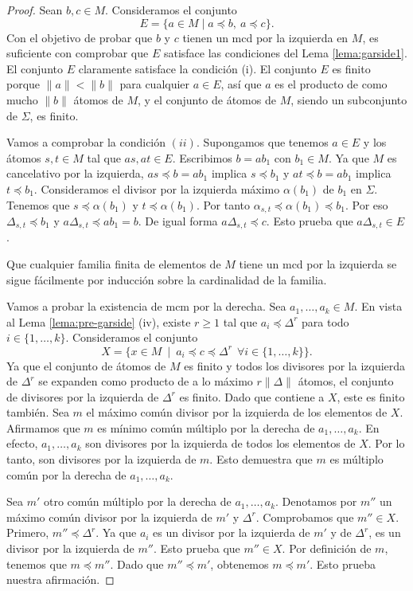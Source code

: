 \documentclass[12pt]{book}
\theoremstyle{definition}
\providecommand{\norm}[1]{\lVert#1\rVert}
\begin{document}
\begin{proof} Sean $b,c\in M$. Consideramos el conjunto
$$E=\{a\in M\mid a\preceq b,\ a\preceq c\}.$$
Con el objetivo de probar que $b$ y $c$ tienen un mcd por la izquierda en $M$, es suficiente con comprobar que $E$ satisface las condiciones del Lema \ref{lema:garside1}. El conjunto $E$ claramente satisface la condición (i). El conjunto $E$ es finito porque $\norm{a}<\norm{b}$ para cualquier $a\in E$, así que $a$ es el producto de como mucho $\norm{b}$ átomos de $M$, y el conjunto de átomos de $M$, siendo un subconjunto de $\Sigma$, es finito.

Vamos a comprobar la condición $(ii)$. Supongamos que tenemos $a\in E$ y los átomos $s,t\in M$ tal que $as,at\in E$. Escribimos $b=ab_1$ con $b_1\in M$. Ya que $M$ es cancelativo por la izquierda, $as\preceq b =ab_1$ implica $s\preceq b_1$ y $at\preceq b = ab_1$ implica $t\preceq b_1$. Consideramos el divisor por la izquierda máximo $\alpha(b_1)$ de $b_1$ en $\Sigma$. Tenemos que $s\preceq\alpha(b_1)$ y $t\preceq\alpha(b_1)$. Por tanto $\alpha_{s,t}\preceq \alpha(b_1)\preceq b_1$. Por eso $\Delta_{s,t}\preceq b_1$ y $a\Delta_{s,t}\preceq ab_1= b$. De igual forma $a\Delta_{s,t}\preceq c$. Esto prueba que $a\Delta_{s,t}\in E$.

Que cualquier familia finita de elementos de $M$ tiene un mcd por la izquierda se sigue fácilmente por inducción sobre la cardinalidad de la familia.

Vamos a probar la existencia de mcm por la derecha. Sea $a_1,\ldots,a_k\in M$. En vista al Lema \ref{lema:pre-garside} (iv), existe $r\geq 1$ tal que $a_i\preceq\Delta^r$ para todo $i\in\{1,\ldots,k\}$. Consideramos el conjunto
$$X=\{x\in M\ \mid \ a_i\preceq c\preceq\Delta^r\ \ \forall i\in\{1,\ldots,k\}\}.$$
Ya que el conjunto de átomos de $M$ es finito y todos los divisores por la izquierda de $\Delta^r$ se expanden como producto de a lo máximo $r\norm{\Delta}$ átomos, el conjunto de divisores por la izquierda de $\Delta^r$ es finito. Dado que contiene a $X$, este es finito también. Sea $m$ el máximo común divisor por la izquierda de los elementos de $X$. Afirmamos que $m$ es mínimo común múltiplo por la derecha de $a_1,\ldots,a_k$. En efecto, $a_1,\ldots,a_k$ son divisores por la izquierda de todos los elementos de $X$. Por lo tanto, son divisores por la izquierda de $m$. Esto demuestra que $m$ es múltiplo común por la derecha de $a_1,\ldots,a_k$.

Sea $m'$ otro común múltiplo por la derecha de $a_1,\ldots,a_k$. Denotamos por $m''$ un máximo común divisor por la izquierda de $m'$ y $\Delta^r$. Comprobamos que $m''\in X$. Primero, $m''\preceq\Delta^r$. Ya que $a_i$ es un divisor por la izquierda de $m'$ y de $\Delta^r$, es un divisor por la izquierda de $m''$. Esto prueba que $m''\in X$. Por definición de $m$, tenemos que $m\preceq m''$. Dado que $m''\preceq m'$, obtenemos $m\preceq m'$. Esto prueba nuestra afirmación.
\end{proof}
\end{document}
